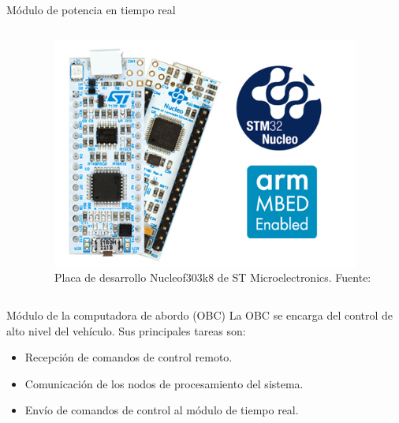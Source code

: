 \documentclass[10pt]{beamer}
\begin{document}
\begin{frame}{Módulo de potencia en tiempo real}
\begin{columns}
\begin{column}{0.5\textwidth}
        \end{column}
        \begin{column}{0.5\textwidth}
            \begin{figure}[!h] 
                \centering
                \includegraphics[width=0.95\textwidth]{../img/nucleo}
                \caption[Placa de desarrollo Nucleof303k8 de ST Microelectronics]{Placa de desarrollo Nucleof303k8 de ST Microelectronics. Fuente: \cite{nucleof303} }
                \end{figure}
        \end{column}
    \end{columns}
\end{frame}




\begin{frame}{Módulo de la computadora de abordo (OBC)}
    La OBC se encarga del control de alto nivel del vehículo. Sus principales tareas son:
    \begin{itemize}
        \item Recepción de comandos de control remoto.
        \item Comunicación de los nodos de procesamiento del sistema.
        \item Envío de comandos de control al módulo de tiempo real.
    \end{itemize}
\end{frame}
\end{document}
